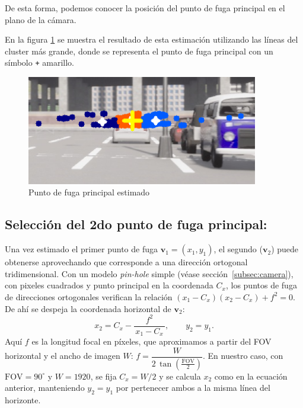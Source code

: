 %
%
%
%

De esta forma, podemos conocer la posición del punto de fuga principal en el plano de la cámara.

En la figura \ref{fig:vanishingPoint} se muestra el resultado de esta estimación utilizando las líneas del cluster más grande, donde se
representa el punto de fuga principal con un símbolo \texttt{+} amarillo.
\begin{figure}[!ht]
    \centering
    \includegraphics[width=0.9\textwidth]{img/reticule/vanishingPoint}
    \caption{Punto de fuga principal estimado}
    \label{fig:vanishingPoint}
\end{figure}

\subsection{Selección del 2do punto de fuga principal:}

Una vez estimado el primer punto de fuga \(\mathbf{v}_1=(x_1,y_1)\), el segundo (\(\mathbf{v}_2\)) puede obtenerse
aprovechando que corresponde a una dirección ortogonal tridimensional. Con un modelo \emph{pin-hole} simple (véase sección~\ref{subsec:camera}), con pixeles cuadrados y  punto principal en la coordenada \(C_x\), los puntos de fuga de direcciones ortogonales verifican la relación \( (x_1-C_x)(x_2-C_x) + f^2 = 0 \). De ahí se despeja la coordenada horizontal de \(\mathbf{v}_2\):
\begin{equation}
    x_2 = C_x - \frac{f^2}{\,x_1 - C_x\,}, \qquad y_2 = y_1.
\end{equation}
Aquí \(f\) es la longitud focal en píxeles, que aproximamos a partir del FOV horizontal y el ancho de imagen \(W\):
\( f = \dfrac{W}{2\,\tan(\tfrac{\text{FOV}}{2})} \). En nuestro caso, con \(\text{FOV}=90^\circ\) y \(W=1920\), se fija
\(C_x=W/2\) y se calcula \(x_2\) como en la ecuación anterior, manteniendo \(y_2=y_1\) por pertenecer ambos a la misma línea del horizonte.

